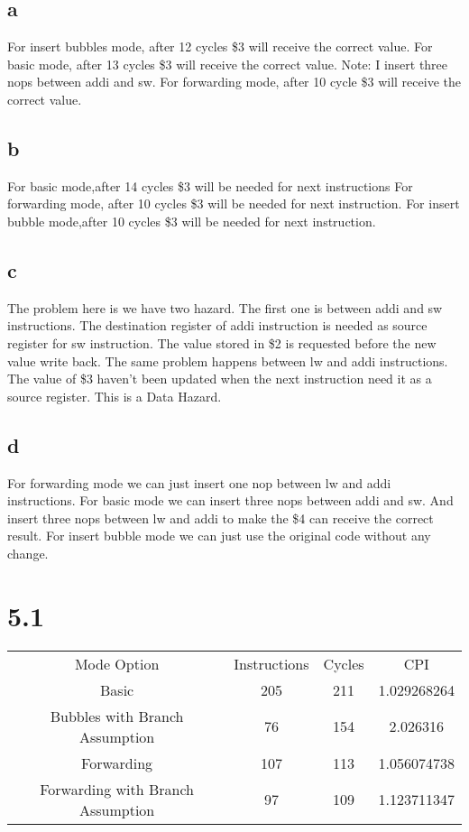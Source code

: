 \documentclass[]{article}
\begin{document}
\subsection*{a}
For insert bubbles mode, after 12 cycles \$3 will receive the correct value.\newline
For basic mode, after 13 cycles \$3 will receive the correct value.\newline
Note: I insert three nops between addi and sw. \newline 
For forwarding mode, after 10 cycle \$3 will receive the correct value.\newline
\subsection*{b}
For basic mode,after 14 cycles \$3 will be needed for next instructions\newline
For forwarding mode, after 10 cycles \$3 will be needed for next instruction.\newline
For insert bubble mode,after 10 cycles \$3 will be needed for next instruction.\newline
\subsection*{c}
The problem here is we have two hazard. The first one is between addi and sw instructions. The destination register of addi instruction is needed as source register for sw instruction. The value stored in \$2 is requested before the new value write back. The same problem happens between lw and addi instructions. The value of \$3 haven't been updated when the next instruction need it as a source register.
This is a Data Hazard. 
\subsection*{d}
For forwarding mode we can just insert one nop between lw and addi instructions.\newline
For basic mode we can insert three nops between addi and sw. And insert three nops between lw and addi to make the \$4 can receive the correct result.\newline
For insert bubble mode we can just use the original code without any change.\newline
\section*{5.1}
\begin{center}
	\begin{tabular}{ c c c c }
		Mode Option & Instructions & Cycles & CPI \\
		Basic & 205 & 211 & 1.029268264 \\
		Bubbles with Branch Assumption& 76 & 154 & 2.026316\\
		Forwarding & 107 & 113 & 1.056074738\\
		Forwarding with Branch Assumption & 97 &  109  & 1.123711347\\
	\end{tabular}

\end{center}
\end{document}

